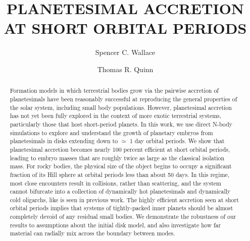 \documentclass[twocolumn]{aastex63}
\begin{document}
\title{PLANETESIMAL ACCRETION AT SHORT ORBITAL PERIODS}

\author{Spencer C. Wallace}

\author{Thomas R. Quinn}

\begin{abstract}
Formation models in which terrestrial bodies grow via the pairwise
accretion of planetesimals have been reasonably successful at
reproducing the general properties of the solar system, including
small body populations. However, planetesimal accretion has not yet
been fully explored in the context of more exotic terrestrial systems,
particularly those that host short-period planets. In this work, we
use direct N-body simulations to explore and understand the growth of
planetary embryos from planetesimals in disks extending down to
$\simeq$ 1 day orbital periods. We show that planetesimal accretion
becomes nearly 100 percent efficient at short orbital periods, leading
to embryo masses that are roughly twice as large as the classical
isolation mass. For rocky bodies, the physical size of the object
begins to occupy a significant fraction of its Hill sphere at orbital
periods less than about 50 days. In this regime, most close encounters
result in collisions, rather than scattering, and the system cannot
bifurcate into a collection of dynamically hot planetesimals and
dynamically cold oligarchs, like is seen in previous work. The highly
efficient accretion seen at short orbital periods implies that systems
of tightly-packed inner planets should be almost completely devoid of
any residual small bodies. We demonstrate the robustness of our
results to assumptions about the initial disk model, and also
investigate how far material can radially mix across the boundary
between modes.
\end{abstract}
\end{document}
